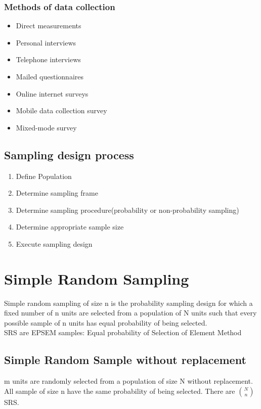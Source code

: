 \documentclass{article}
\theoremstyle{definition}
\theoremstyle{thrm}
\theoremstyle{lma}
\theoremstyle{ppst}
\theoremstyle{crlr}
\begin{document}
\subsubsection{Methods of data collection}
\begin{itemize}
	\item Direct measurements
	\item Personal interviews
	\item Telephone interviews
	\item Mailed questionnaires
	\item Online internet surveys
	\item Mobile data collection survey
	\item Mixed-mode survey
\end{itemize}

\subsection{Sampling design process}
\begin{enumerate}
	\item Define Population
	\item Determine sampling frame
	\item Determine sampling procedure(probability or non-probability sampling)
	\item Determine appropriate sample size
	\item Execute sampling design
\end{enumerate}

\section{Simple Random Sampling}
Simple random sampling of size n is the probability sampling design for which a fixed number of n units are selected from a population of N units such that every possible sample of n units has equal probability of being selected. \\
SRS are EPSEM samples: Equal probability of Selection of Element Method

\subsection{Simple Random Sample without replacement}
m units are randomly selected from a population of size N without replacement.\\
All sample of size n have the same probability of being selected. There are $N \choose n$ SRS.
\end{document}
